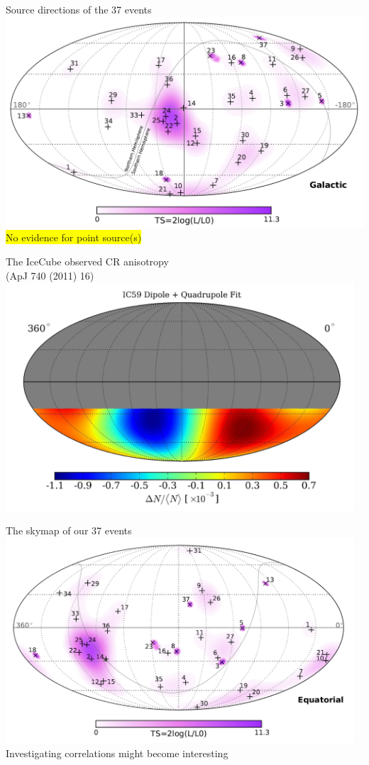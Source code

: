 \Tr
\onecolumn
\begin{center}
{\blue Source directions of the 37 events}\\
\includegraphics[keepaspectratio,width=20cm]{hese-skymap-gal}\\
\colorbox{yellow}{No evidence for point source(s)}
\end{center}

\Tr
\twocolumn
%
\begin{center}
{\blue The IceCube observed CR anisotropy}\\
(ApJ 740 (2011) 16)\\
\includegraphics[keepaspectratio,width=13cm]{cr-anisotropy}\\[5mm]
\end{center}

\newpage

\begin{center}
{\blue The skymap of our 37 events}\\[1.2cm]
\includegraphics[keepaspectratio,width=13cm]{hese-skymap-equ}\\[5mm]
Investigating correlations might become interesting
\end{center}
